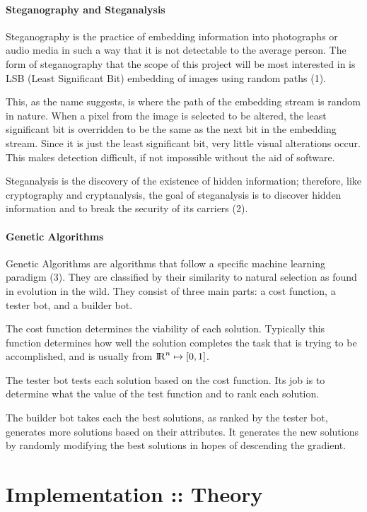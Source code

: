 \documentclass[12pt]{article}
\begin{document}
\paragraph{Steganography and Steganalysis}
\par Steganography is the practice of embedding information into photographs or audio media in such a way that it is not detectable to the average person. The form of steganography that the scope of this project will be most interested in is LSB (Least Significant Bit) embedding of images using random paths (1).
\par This, as the name suggests, is where the path of the embedding stream is random in nature. When a pixel from the image is selected to be altered, the least significant bit is overridden to be the same as the next bit in the embedding stream. Since it is just the least significant bit, very little visual alterations occur. This makes detection difficult, if not impossible without the aid of software. 
\par Steganalysis is the discovery of the existence of hidden information; therefore, like cryptography and cryptanalysis, the goal of steganalysis is to discover hidden information and to break the security of its carriers (2).
\paragraph{Genetic Algorithms}
\par Genetic Algorithms are algorithms that follow a specific machine learning paradigm (3). They are classified by their similarity to natural selection as found in evolution in the wild. They consist of three main parts: a cost function, a tester bot, and a builder bot.
\par The cost function determines the viability of each solution. Typically this function determines how well the solution completes the task that is trying to be accomplished, and is usually from ${\rm I\!R}^n \mapsto [0, 1]$. 
\par The tester bot tests each solution based on the cost function. Its job is to determine what the value of the test function and to rank each solution.
\par The builder bot takes each the best solutions, as ranked by the tester bot, generates more solutions based on their attributes. It generates the new solutions by randomly modifying the best solutions in hopes of descending the gradient.

\section{Implementation :: Theory}
\end{document}
